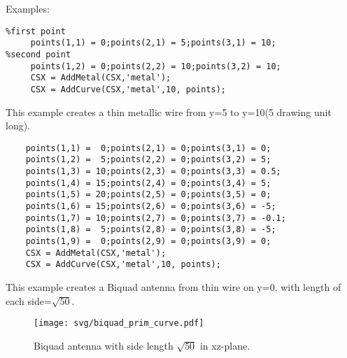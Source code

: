 \begin{FontDescr}{Examples:}

\begin{lstlisting} 
%first point
     points(1,1) = 0;points(2,1) = 5;points(3,1) = 10; 
%second point
     points(1,2) = 0;points(2,2) = 10;points(3,2) = 10; 
     CSX = AddMetal(CSX,'metal'); 
     CSX = AddCurve(CSX,'metal',10, points);
\end{lstlisting}
This example creates a thin metallic wire from y=5 to y=10(5 drawing unit long).

\begin{lstlisting} 
    points(1,1) =  0;points(2,1) = 0;points(3,1) = 0;
    points(1,2) =  5;points(2,2) = 0;points(3,2) = 5;
    points(1,3) = 10;points(2,3) = 0;points(3,3) = 0.5;
    points(1,4) = 15;points(2,4) = 0;points(3,4) = 5;
    points(1,5) = 20;points(2,5) = 0;points(3,5) = 0;
    points(1,6) = 15;points(2,6) = 0;points(3,6) = -5;
    points(1,7) = 10;points(2,7) = 0;points(3,7) = -0.1;
    points(1,8) =  5;points(2,8) = 0;points(3,8) = -5;
    points(1,9) =  0;points(2,9) = 0;points(3,9) = 0;
    CSX = AddMetal(CSX,'metal'); 
    CSX = AddCurve(CSX,'metal',10, points);
\end{lstlisting}
This example creates a Biquad antenna from thin wire on y=0, with length of each side=$\sqrt{50}$.
\end{FontDescr}

\begin{figure}[hbt]
\centering
\texttt{[image: svg/biquad\_prim\_curve.pdf]}
\caption{Biquad antenna with side length $\sqrt{50}$ in xz-plane.}
\label{fig:primCurve}
\end{figure}